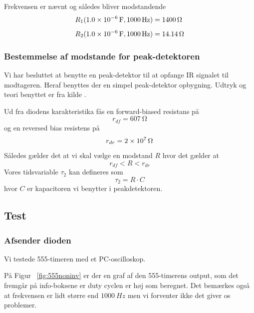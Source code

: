 Frekvensen er nævnt og således bliver modstandende
\begin{align}
	R_1(\SI{1.0d-6}{\farad},\SI{1000}{\hertz})&= \SI{1400}{\ohm} \\[1ex]
	R_2(\SI{1.0d-6}{\farad},\SI{1000}{\hertz})&= \SI{14.14}{\ohm}
\end{align}

\subsubsection{Bestemmelse af modstande for peak-detektoren}

Vi har besluttet at benytte en peak-detektor til at opfange IR signalet til modtageren. Heraf benyttes der en simpel peak-detektor opbygning.  Udtryk og teori benyttet er fra kilde \cite{peakdetectorCalc}.

Ud fra diodens karakteristika fås en forward-biased resistans på
\[
	r_{df} = \SI{607}{\ohm}
\]
og en reversed bias resistens på
\[
	r_{dr} = \SI{2d7}{\ohm}
\]
Således gælder det at vi skal vælge en modstand $R$ hvor det gælder at
\[
	r_{df} < R < r_{dr}
\]
Vores tidsvariable  $\tau_2$ kan defineres som
\[
	\tau_2 = R \cdot C
\]
hvor $C$ er kapacitoren vi benytter i peakdetektoren.

\subsection{Test}
\subsubsection{Afsender dioden}
Vi testede 555-timeren med et PC-oscilloskop.

På Figur ~\ref{fig:555noninv} er der en graf af den 555-timerens output, som det fremgår på info-boksene er duty cyclen er høj som beregnet. Det bemærkes også at frekvensen er lidt større end $\SI{1000}{Hz}$ men vi forventer ikke det giver os problemer.

